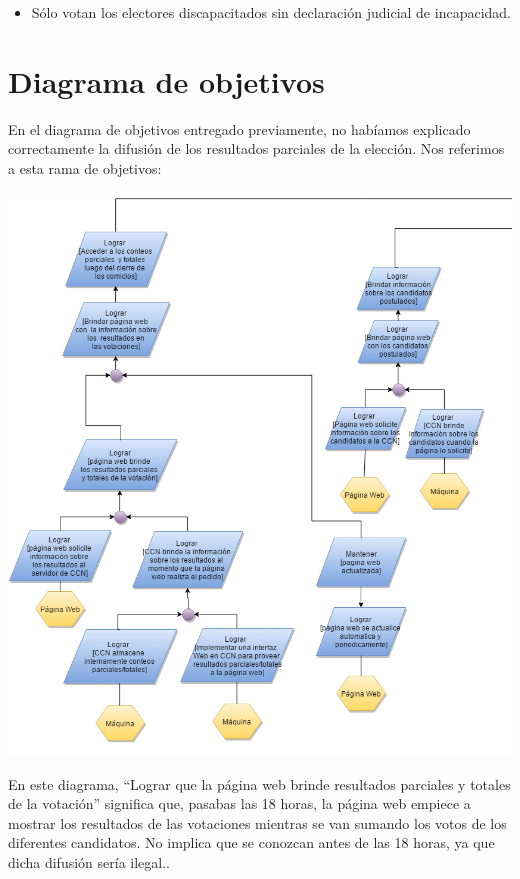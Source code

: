 \documentclass[spanish, 10pt,a4paper]{article}
\numberwithin{equation}{section} %
\begin{document}
\begin{itemize}
\item Sólo votan los electores discapacitados sin declaración judicial de incapacidad.
\end{itemize}

\section{Diagrama de objetivos}

En el diagrama de objetivos entregado previamente, no habíamos explicado correctamente la difusión de los resultados parciales de la elección. Nos referimos a esta rama de objetivos:

\includegraphics[width=\textwidth]{diagrama.png}

En este diagrama, ``Lograr que la página web brinde resultados parciales y totales de la votación'' significa que, pasabas las 18 horas, la página web empiece a mostrar los resultados de las votaciones mientras se van sumando los votos de los diferentes candidatos. No implica que se conozcan antes de las 18 horas, ya que dicha difusión sería ilegal..
\end{document}
